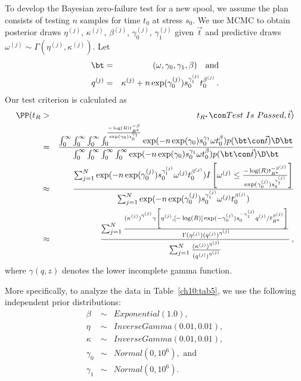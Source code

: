 \documentclass {book}
\begin{document}
To develop the Bayesian zero-failure test for a
new spool, we assume the plan consists of testing $n$ samples for
time $t_{0}$ at stress $s_{0}$. We use MCMC to obtain posterior
draws $\eta^{(j)}$, $\kappa^{(j)}$, $\beta^{(j)}$,
$\gamma_{0}^{(j)}$, $\gamma_{1}^{(j)}$ given $\vec{t}$ and
predictive draws $\omega^{(j)} \sim
\Gamma(\eta^{(j)},\kappa^{(j)})$. Let
\begin{eqnarray*}
\bt & = & (\omega, \gamma_0, \gamma_1, \beta) \quad \mbox{and}\\
q^{(j)} & = & \kappa^{(j)}+n
\exp(\gamma_{0}^{(j)})s^{\gamma_{1}^{(j)}}_{0}t^{\beta^{(j)}}_{0}
\, .
\end{eqnarray*}
Our test criterion is calculated as
\begin{eqnarray}\label{ch10:wtc4}
\PP(t_{R} & > & t_{R^*} \con Test\mbox{ } Is\mbox{ }Passed,
\vec{t})\\\nonumber & = & \frac{\int_0^\infty \int_0^\infty
\int_0^\infty
\int_0^{\frac{-\log(R)t_{R^*}^{-\beta}}{\exp(\gamma_0)s_0^{\gamma_1}}}
\exp(-n\exp(\gamma_0)s_0^{\gamma_1}\omega t_0^{\beta}) p(\bt \con
\vec{t}) \D \bt}{\int_0^\infty \int_0^\infty \int_0^\infty
\int_0^\infty \exp(-n\exp(\gamma_0)s_0^{\gamma_1}\omega
t_0^{\beta}) p(\bt \con \vec{t}) \D \bt}\\\nonumber \mbox{} &
\approx & \frac{\sum_{j=1}^{N}
\exp(-n\exp(\gamma_0^{(j)})s_0^{\gamma_1^{(j)}}\omega^{(j)}
t_0^{\beta^{(j)}}) I\left[\omega^{(j)} \leq
\frac{-\log(R)t_{R^*}^{-\beta^{(j)}}}{\exp(\gamma_0^{(j)})s_0^{\gamma_1^{(j)}}}\right]}
{\sum_{j=1}^{N}
\exp(-n\exp(\gamma_0^{(j)})s_0^{\gamma_1^{(j)}}\omega^{(j)}
t_0^{\beta^{(j)}})}\\\nonumber & \approx & \frac{ \sum^{N}_{j=1}
\frac{ {(\kappa^{(j)})}^{\eta^{(j)}} \gamma \left[ \eta^{(j)},
[-\log (R)] \exp(-\gamma_{0}^{(j)})
 s_{0}^{-\gamma_{1}^{(j)}}
 q^{(j)}
/t^{\beta^{(j)}}_{R^{*}} \right]}{\Gamma(\eta^{(j)}){(q^{(j)})
}^{\eta^{(j)}}}} { \sum^{N}_{j=1} \frac
{{(\kappa^{(j)})}^{\eta^{(j)}}}{{{(q^{(j)}) }^{\eta^{(j)}}}}
}\nonumber \, ,
\end{eqnarray}
where $\gamma(q, z)$ denotes the lower incomplete gamma function.

More specifically, to analyze the data in Table~\ref{ch10:tab5},
we use the following independent prior distributions:
\begin{eqnarray*}
\beta & \sim & Exponential(1.0),\\
\eta & \sim &
InverseGamma(0.01, 0.01),\\
\kappa & \sim & InverseGamma(0.01, 0.01),\\
\gamma_{0} & \sim & Normal(0, 10^{6}), \mbox{ and}\\
\gamma_{1} & \sim & Normal(0,10^{6}).
\end{eqnarray*}
\end{document}
